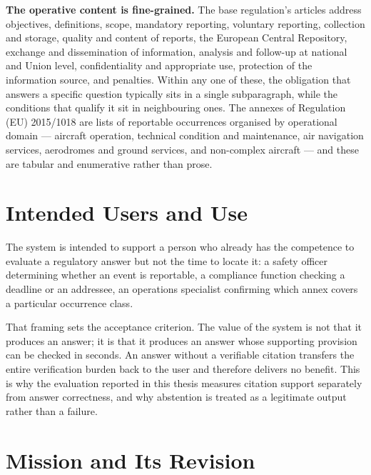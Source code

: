 \textbf{The operative content is fine-grained.} The base regulation's articles address objectives, definitions, scope, mandatory reporting, voluntary reporting, collection and storage, quality and content of reports, the European Central Repository, exchange and dissemination of information, analysis and follow-up at national and Union level, confidentiality and appropriate use, protection of the information source, and penalties. Within any one of these, the obligation that answers a specific question typically sits in a single subparagraph, while the conditions that qualify it sit in neighbouring ones. The annexes of Regulation (EU) 2015/1018 are lists of reportable occurrences organised by operational domain --- aircraft operation, technical condition and maintenance, air navigation services, aerodromes and ground services, and non-complex aircraft --- and these are tabular and enumerative rather than prose.


\section{Intended Users and Use}
\label{sec:context-users}

The system is intended to support a person who already has the competence to evaluate a regulatory answer but not the time to locate it: a safety officer determining whether an event is reportable, a compliance function checking a deadline or an addressee, an operations specialist confirming which annex covers a particular occurrence class.

That framing sets the acceptance criterion. The value of the system is not that it produces an answer; it is that it produces an answer whose supporting provision can be checked in seconds. An answer without a verifiable citation transfers the entire verification burden back to the user and therefore delivers no benefit. This is why the evaluation reported in this thesis measures citation support separately from answer correctness, and why abstention is treated as a legitimate output rather than a failure.

\section{Mission and Its Revision}
\label{sec:context-mission}

